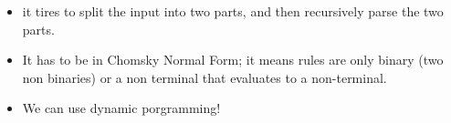 \documentclass[11pt]{article}
\begin{document}
\begin{minipage}[l]{.5\linewidth}
    \begin{figure}[H]
        \centering
    \end{figure}    
\end{minipage}\hfill
\begin{minipage}[r]{.48\linewidth}
    \begin{itemize}
        \item it tires to split the input into two parts, and then recursively parse the two parts.
        \item It has to be in Chomsky Normal Form; it means rules are only binary (two non binaries) or a non terminal that evaluates to a non-terminal.
    \end{itemize}
\end{minipage}

\begin{minipage}[l]{.5\linewidth}
    \begin{figure}[H]
        \centering
    \end{figure}    
\end{minipage}\hfill
\begin{minipage}[r]{.48\linewidth}
    \begin{itemize}
        \item We can use dynamic porgramming!
    \end{itemize}
\end{minipage}
\end{document}
